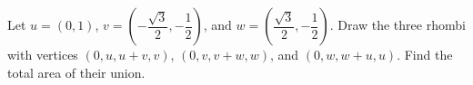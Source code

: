 Let $u=(0,1)$, $v=(-\dfrac{\sqrt3}{2},-\dfrac{1}{2})$, and $w=(\dfrac{\sqrt3}{2},-\dfrac{1}{2})$. Draw the three rhombi with vertices $(0,u,u+v,v)$, $(0,v,v+w,w)$, and $(0,w,w+u,u)$. Find the total area of their union.
